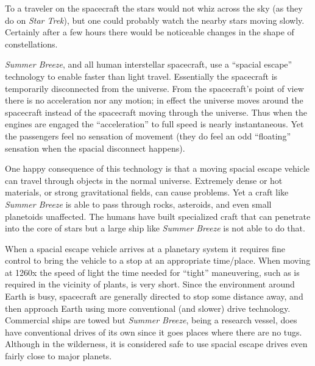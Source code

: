 To a traveler on the spacecraft the stars would not whiz across the sky (as they do on
\textit{Star Trek}), but one could probably watch the nearby stars moving slowly. Certainly
after a few hours there would be noticeable changes in the shape of constellations.

\textit{Summer Breeze}, and all human interstellar spacecraft, use a ``spacial escape''
technology to enable faster than light travel. Essentially the spacecraft is temporarily
disconnected from the universe. From the spacecraft's point of view there is no acceleration nor
any motion; in effect the universe moves around the spacecraft instead of the spacecraft moving
through the universe. Thus when the engines are engaged the ``acceleration'' to full speed is
nearly instantaneous. Yet the passengers feel no sensation of movement (they do feel an odd
``floating'' sensation when the spacial disconnect happens).

One happy consequence of this technology is that a moving spacial escape vehicle can travel
through objects in the normal universe. Extremely dense or hot materials, or strong
gravitational fields, can cause problems. Yet a craft like \textit{Summer Breeze} is able to
pass through rocks, asteroids, and even small planetoids unaffected. The humans have built
specialized craft that can penetrate into the core of stars but a large ship like \textit{Summer
  Breeze} is not able to do that.

When a spacial escape vehicle arrives at a planetary system it requires fine control to bring the
vehicle to a stop at an appropriate time/place. When moving at 1260x the speed of light the time
needed for ``tight'' maneuvering, such as is required in the vicinity of plants, is very short.
Since the environment around Earth is busy, spacecraft are generally directed to stop some
distance away, and then approach Earth using more conventional (and slower) drive technology.
Commercial ships are towed but \textit{Summer Breeze}, being a research vessel, does have
conventional drives of its own since it goes places where there are no tugs. Although in the
wilderness, it is considered safe to use spacial escape drives even fairly close to major
planets.


